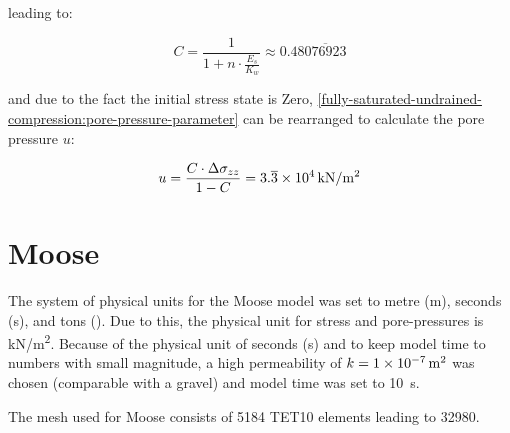 \vspace{1em}

leading to:

\begin{equation}
    C = \frac{1}{1 + n \cdot \frac{E_s}{K_w}} \approx 0.48\overline{076923}
\end{equation}

and due to the fact the initial stress state is Zero,
\autoref{fully-saturated-undrained-compression:pore-pressure-parameter} can be
rearranged to calculate the pore pressure $u$:

\begin{equation}
    u = \frac{C \cdot \Delta \sigma_{zz}}{1 - C} =
    3.\overline{3}\times\SI{E4}{\si[per-mode =
            symbol]{\kilo\newton\per\square\metre}}
\end{equation}


\section{Moose}

The system of physical units for the Moose model was set to metre
(\unit{\metre}), seconds (\unit{\second}), and tons (\unit{\ton}). Due to this,
the physical unit for stress and pore-pressures is \unit[per-mode =
    symbol]{\kilo\newton\per\square\metre}. Because of the physical unit of seconds
(\unit{\second}) and to keep model time to numbers with small magnitude, a high
permeability of $k = \qty{1E-7}{\square\metre}$ was chosen (comparable with a
gravel) and model time was set to \qty{10}{\second}.

The mesh used for Moose consists of \qty{5184}{} TET10 elements leading to
\qty{32980}{\DOF}.

